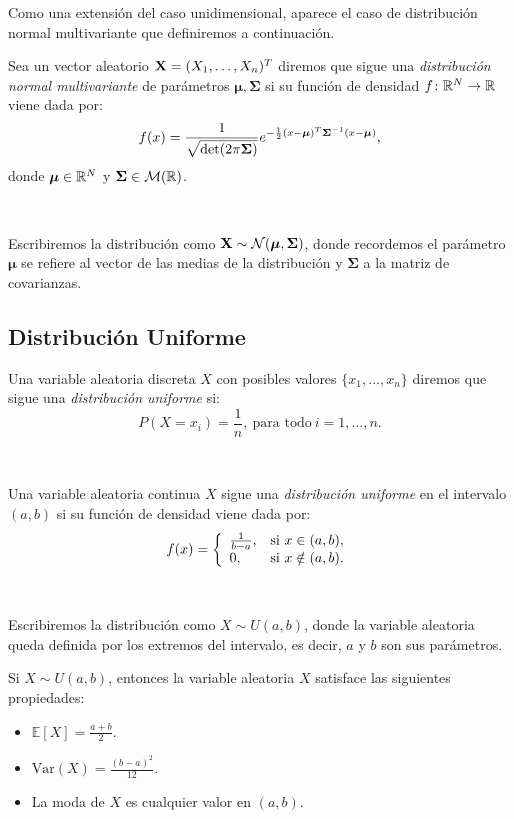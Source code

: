 \documentclass[oneside,openright,titlepage,numbers=noenddot,openany,headinclude,footinclude=true,
cleardoublepage=empty,abstractoff,BCOR=5mm,paper=a4,fontsize=12pt,main=spanish]{scrreprt}
\begin{document}
Como una extensión del caso unidimensional, aparece el caso de distribución normal multivariante que definiremos a continuación.\\

\begin{definition}
Sea un vector aleatorio $\textbf{X}=(X_1,\dots,X_n)^T$ diremos que sigue una \textit{distribución normal multivariante} de parámetros $\bm{\mu},\bm{\Sigma}$ si su función de densidad $f\colon \mathbb{R}^N \to \mathbb{R}$ viene dada por: $$f(x)=\frac{\displaystyle 1}{\displaystyle \sqrt{\text{det}(2\pi \bm{\Sigma})}}e^{-\frac{1}{2}(x-\bm{\mu})^T\bm{\Sigma}^{-1}(x-\bm{\mu})},$$
donde $\bm{\mu}\in \mathbb{R}^N$ y $\bm{\Sigma}\in \mathcal{M}(\mathbb{R})$.
\end{definition}\

Escribiremos la distribución como $\textbf{X} \sim \mathcal{N}(\bm{\mu}, \bm{\Sigma})$, donde recordemos el parámetro $\bm{\mu}$ se refiere al vector de las medias de la distribución y $\bm{\Sigma}$ a la matriz de covarianzas.

\subsection{Distribución Uniforme}

\begin{definition}
Una variable aleatoria discreta $X$ con posibles valores $\{x_1,\dots,x_n\}$ diremos que sigue una \textit{distribución uniforme} si: $$P(X=x_i)=\frac{1}{n}, \ \text{para todo} \ i=1,\dots,n.$$
\end{definition}\

\begin{definition}
Una variable aleatoria continua $X$ sigue una \textit{distribución uniforme} en el intervalo $(a,b)$ si su función de densidad viene dada por: $$f(x)=\left \{
\begin{array}{l l}
\frac{1}{b-a}, & \mbox{si } x \in (a,b), \\
0, & \mbox{si } x \notin (a,b).
\end{array}
\right.$$
\end{definition}\

Escribiremos la distribución como $X \sim U(a,b)$, donde la variable aleatoria queda definida por los extremos del intervalo, es decir, $a$ y $b$ son sus parámetros.\\

\begin{proposition}[Propiedades]
Si $X \sim U(a,b)$, entonces la variable aleatoria $X$ satisface las siguientes propiedades:
\begin{itemize}
    \item $\mathbb{E}[X]=\frac{a+b}{2}$.
    \item $\text{Var}(X)=\frac{(b-a)^2}{12}$.
    \item La moda de $X$ es cualquier valor en $(a,b)$.
\end{itemize}
\end{proposition}
\end{document}
